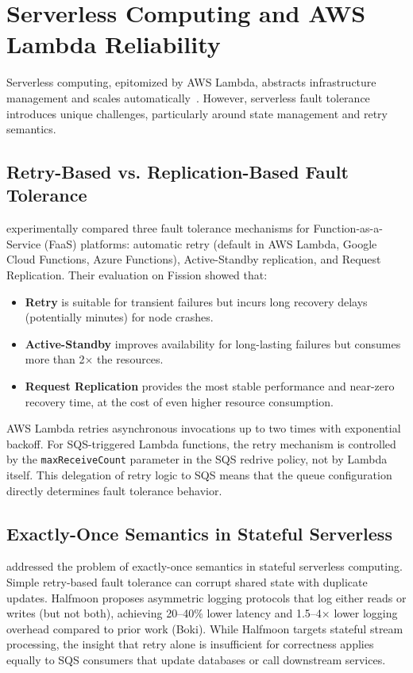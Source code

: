 \section{Serverless Computing and AWS Lambda Reliability}

Serverless computing, epitomized by AWS Lambda, abstracts infrastructure management and scales automatically~\citep{Qi2023Halfmoon}. However, serverless fault tolerance introduces unique challenges, particularly around state management and retry semantics.

\subsection{Retry-Based vs. Replication-Based Fault Tolerance}

\citet{Balla2023FaaSReplication} experimentally compared three fault tolerance mechanisms for Function-as-a-Service (FaaS) platforms: automatic retry (default in AWS Lambda, Google Cloud Functions, Azure Functions), Active-Standby replication, and Request Replication. Their evaluation on Fission showed that:
\begin{itemize}
    \item \textbf{Retry} is suitable for transient failures but incurs long recovery delays (potentially minutes) for node crashes.
    \item \textbf{Active-Standby} improves availability for long-lasting failures but consumes more than 2× the resources.
    \item \textbf{Request Replication} provides the most stable performance and near-zero recovery time, at the cost of even higher resource consumption.
\end{itemize}

AWS Lambda retries asynchronous invocations up to two times with exponential backoff. For SQS-triggered Lambda functions, the retry mechanism is controlled by the \texttt{maxReceiveCount} parameter in the SQS redrive policy, not by Lambda itself. This delegation of retry logic to SQS means that the queue configuration directly determines fault tolerance behavior.

\subsection{Exactly-Once Semantics in Stateful Serverless}

\citet{Qi2023Halfmoon} addressed the problem of exactly-once semantics in stateful serverless computing. Simple retry-based fault tolerance can corrupt shared state with duplicate updates. Halfmoon proposes asymmetric logging protocols that log either reads or writes (but not both), achieving 20–40\% lower latency and 1.5–4× lower logging overhead compared to prior work (Boki). While Halfmoon targets stateful stream processing, the insight that retry alone is insufficient for correctness applies equally to SQS consumers that update databases or call downstream services.

